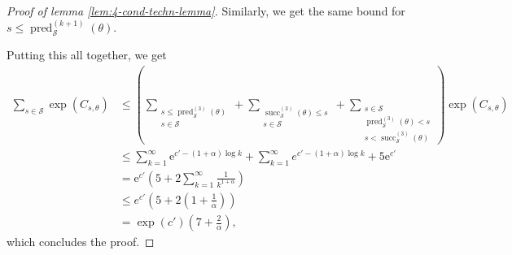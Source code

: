 \documentclass[10pt,a4paper]{amsart}
\newcommand{\e}{\mathrm{e}}
\begin{document}
\begin{proof}[Proof of lemma \ref{lem:4-cond-techn-lemma}]
    Similarly, we get the same bound for $s \le \operatorname{pred}_{\mathcal{S}}^{(k+1)}(\theta)$.
    
    Putting this all together, we get
    \begin{align*}
        \sum_{s\in\mathcal{S}}
            \exp(C_{s,\theta}) &\le
            \left(\sum_{\substack{s \le \operatorname{pred}_{\mathcal{S}}^{(3)}(\theta) \\ s\in\mathcal{S}}}
            +
            \sum_{\substack{\operatorname{succ}_{\mathcal{S}}^{(3)}(\theta) \le s \\ s\in\mathcal{S}}}
            +
            \sum_{\substack{s\in \mathcal{S} \\ \operatorname{pred}_{\mathcal{S}}^{(3)}(\theta) < s \\ s < \operatorname{succ}_{\mathcal{S}}^{(3)}(\theta)}}
            \right) \exp(C_{s,\theta})
            \\
            &\le \sum_{k=1}^\infty \e^{c'-(1+\alpha)\log k} + \sum_{k=1}^\infty e^{c'-(1+\alpha)\log k} + 5\e^{c'} 
            \\
            &= \e^{c'} \left(5 + 2\sum_{k=1}^{\infty} \frac{1}{k^{1+\alpha}}\right) 
            \\
            &\le
            e^{c'} \left(5 + 2\left(1 + \frac{1}{\alpha}\right)\right)
            \\
            &=
            \exp(c')\left(7 + \frac{2}{\alpha}\right),
    \end{align*}
    which concludes the proof.
\end{proof}
\end{document}
